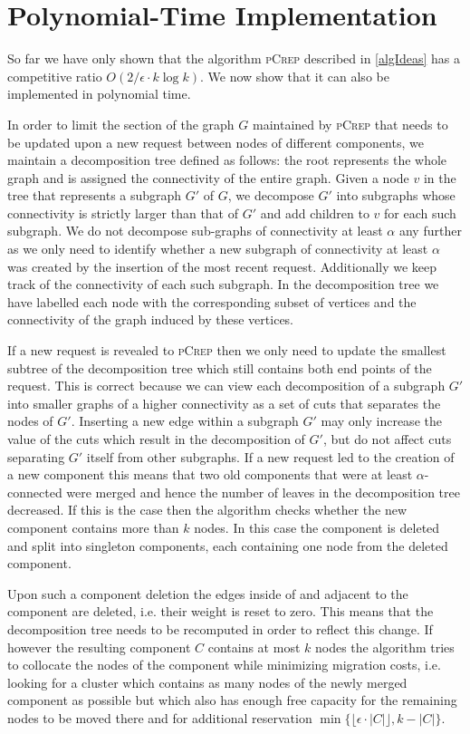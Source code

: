 \documentclass[a4paper,UKenglish,cleveref, autoref, thm-restate,authorcolumns]{lipics-v2019}
\newcommand{\adjDel}{\textsc{pCrep}}
\begin{document}
\section{Polynomial-Time Implementation}
\label{implDetSection}

So far we have only shown that the algorithm \adjDel{} described in \cref{algIdeas} has a competitive ratio $O(2/\epsilon\cdot k \log k)$. 
We now show that it can also be implemented in polynomial time. 

In order to limit the section of the graph $G$ maintained by \adjDel{} that needs to be updated upon a new request between nodes of different components, we maintain a decomposition tree defined as follows: the root represents the whole graph and is assigned the connectivity of the entire graph. Given a node $v$ in the tree that represents a subgraph $G'$ of $G$, we decompose $G'$ into subgraphs whose connectivity is strictly larger than that of $G'$ and add children to $v$ for each such subgraph. We do not decompose sub-graphs of connectivity at least $\alpha$ any further as we only need to identify whether a new subgraph of connectivity at least $\alpha$ was created by the insertion of the most recent request.
Additionally we keep track of the connectivity of each such subgraph.
In the decomposition tree we have labelled each node with the corresponding subset of vertices and the connectivity of the graph induced by these vertices.

If a new request is revealed to \adjDel{} then we only need to update the smallest subtree of the decomposition tree which still contains both end points of the request. 
This is correct because we can view each decomposition of a subgraph $G'$ into smaller graphs of a higher connectivity as a set of cuts that separates the nodes of $G'$. Inserting a new edge within a subgraph $G'$ may only increase the value of the cuts which result in the decomposition of $G'$, but do not affect cuts separating $G'$ itself from other subgraphs.
If a new request led to the creation of a new component this means that two old components that were at least $\alpha$-connected were merged and hence the number of leaves in the decomposition tree decreased. If this is the case then the algorithm checks whether the new component contains more than $k$ nodes. In this case the component is deleted and split into singleton components, each containing one node from the deleted component.

Upon such a component deletion the edges inside of and adjacent to the component are deleted, i.e. their weight is reset to zero. This means that the decomposition tree needs to be recomputed in order to reflect this change.
If however the resulting component $C$ contains at most $k$ nodes the algorithm tries to collocate the nodes of the component while minimizing migration costs, i.e. looking for a cluster which contains as many nodes of the newly merged component as possible but which also has enough free capacity for the remaining nodes to be moved there and for additional reservation $\min\{\lfloor\epsilon\cdot|C|\rfloor,k-|C|\}$.
\end{document}
